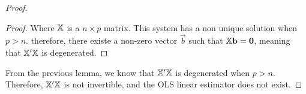 \begin{claim*}
\begin{proof}
\begin{lemma*}
\begin{proof}
                Where $\mathbb{X}$ is a $n \times p$ matrix. This system has a non unique solution when $p > n$. therefore, there existe a non-zero vector $\Vec{b}$ such that $\mathbb{X}\mathbf{b} = \mathbf{0}$, meaning that $\mathbb{X}'\mathbb{X}$ is degenerated.
            \end{proof}
        \end{lemma*}

        From the previous lemma, we know that $\mathbb{X}'\mathbb{X}$ is degenerated when $p > n$. Therefore, $\mathbb{X}'\mathbb{X}$ is not invertible, and the OLS linear estimator does not exist.
    \end{proof}
\end{claim*}